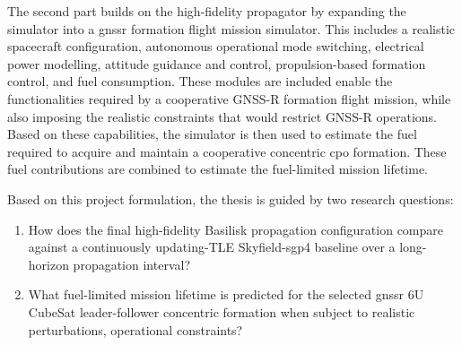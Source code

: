 The second part builds on the high-fidelity propagator by expanding the simulator into a \gls{gnssr} formation flight mission simulator. This includes a realistic spacecraft configuration, autonomous operational mode switching, electrical power modelling, attitude guidance and control, propulsion-based formation control, and fuel consumption. These modules are included enable the functionalities required by a cooperative GNSS-R formation flight mission, while also imposing the realistic constraints that would restrict GNSS-R operations. Based on these capabilities, the simulator is then used to estimate the fuel required to acquire and maintain a cooperative concentric \gls{cpo} formation. These fuel contributions are combined to estimate the fuel-limited mission lifetime.

Based on this project formulation, the thesis is guided by two research questions:

\begin{enumerate}
\item How does the final high-fidelity Basilisk propagation configuration compare against a continuously updating-TLE Skyfield-\gls{sgp4} baseline over a long-horizon propagation interval?

\item What fuel-limited mission lifetime is predicted for the selected \gls{gnssr} 6U CubeSat leader-follower concentric formation when subject to realistic perturbations, operational constraints?
\end{enumerate}

